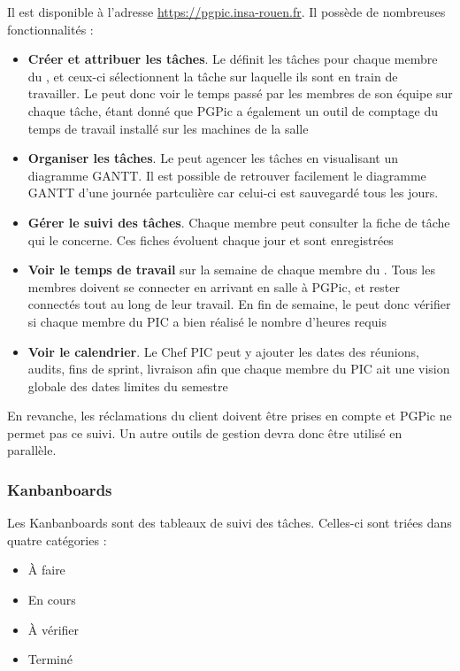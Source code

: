 Il est disponible à l’adresse \url{https://pgpic.insa-rouen.fr}. Il possède de nombreuses fonctionnalités : 
\begin{itemize}
\item \textbf{Créer et attribuer les tâches}. Le \CP{} définit les tâches pour chaque membre du \PICCourt, et ceux-ci sélectionnent la tâche sur laquelle ils sont en train de travailler. Le \CP{} peut donc voir le temps passé par les membres de son équipe sur chaque tâche, étant donné que PGPic a également un outil de comptage du temps de travail installé sur les machines de la salle \PICCourt
\item \textbf{Organiser les tâches}. Le \CP{} peut agencer les tâches en visualisant un diagramme GANTT. Il est possible de retrouver facilement le diagramme GANTT d'une journée partculière car celui-ci est sauvegardé tous les jours. 
\item \textbf{Gérer le suivi des tâches}. Chaque membre peut consulter la fiche de tâche qui le concerne. Ces fiches évoluent chaque jour et sont enregistrées
\item \textbf{Voir le temps de travail} sur la semaine de chaque membre du \PICCourt. Tous les membres doivent se connecter en arrivant en salle \PICCourt à PGPic, et rester connectés tout au long de leur travail. En fin de semaine, le \CP{} peut donc vérifier si chaque membre du PIC a bien réalisé le nombre d’heures requis
\item \textbf{Voir le calendrier}. Le Chef PIC peut y ajouter les dates des réunions, audits, fins de sprint, livraison afin que chaque membre du PIC ait une vision globale des dates limites du semestre \\ 
\end{itemize}

En revanche, les réclamations du client doivent être prises en compte et PGPic ne permet pas ce suivi. Un autre outils de gestion devra donc être utilisé en parallèle. 


\subsubsection*{Kanbanboards} 

Les Kanbanboards sont des tableaux de suivi des tâches. Celles-ci sont triées dans quatre catégories :
\begin{itemize}
\item \`A faire
\item En cours
\item \`A vérifier
\item Terminé \\ 
\end{itemize}

